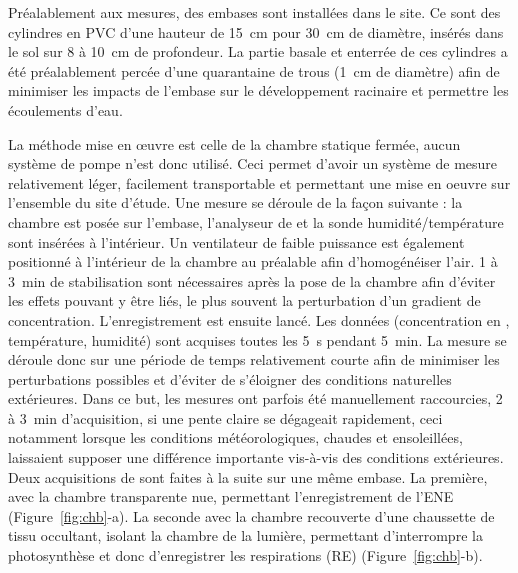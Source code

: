 Préalablement aux mesures, des embases sont installées dans le site.
Ce sont des cylindres en PVC d'une hauteur de \SI{15}{\centi\metre} pour \SI{30}{\centi\metre} de diamètre, insérés dans le sol sur 8 à \SI{10}{\centi\metre} de profondeur.
La partie basale et enterrée de ces cylindres a été préalablement percée d'une quarantaine de trous (\SI{1}{\centi\metre} de diamètre) afin de minimiser les impacts de l'embase sur le développement racinaire et permettre les écoulements d'eau.

La méthode mise en œuvre est celle de la chambre statique fermée, aucun système de pompe n'est donc utilisé.
Ceci permet d'avoir un système de mesure relativement léger, facilement transportable et permettant une mise en oeuvre sur l'ensemble du site d'étude.
Une mesure se déroule de la façon suivante :
la chambre est posée sur l'embase, l'analyseur de \coo et la sonde humidité/température sont insérées à l'intérieur.
Un ventilateur de faible puissance est également positionné à l'intérieur de la chambre au préalable afin d'homogénéiser l'air.
1 à \SI{3}{\minute} de stabilisation sont nécessaires après la pose de la chambre afin d'éviter les effets pouvant y être liés, le plus souvent la perturbation d'un gradient de concentration.
L’enregistrement est ensuite lancé.
Les données (concentration en \coo, température, humidité) sont acquises toutes les \SI{5}{\second} pendant \SI{5}{\minute}.
La mesure se déroule donc sur une période de temps relativement courte afin de minimiser les perturbations possibles et d'éviter de s'éloigner des conditions naturelles extérieures.
Dans ce but, les mesures ont parfois été manuellement raccourcies, 2 à \SI{3}{\minute} d'acquisition, si une pente claire se dégageait rapidement, ceci notamment lorsque les conditions météorologiques, chaudes et ensoleillées, laissaient supposer une différence importante vis-à-vis des conditions extérieures.
Deux acquisitions de \coo sont faites à la suite sur une même embase.
La première, avec la chambre transparente nue, permettant l'enregistrement de l'ENE (Figure~\ref{fig:chb}-a).
La seconde avec la chambre recouverte d'une chaussette de tissu occultant, isolant la chambre de la lumière, permettant d'interrompre la photosynthèse et donc d'enregistrer les respirations (RE) (Figure~\ref{fig:chb}-b).

